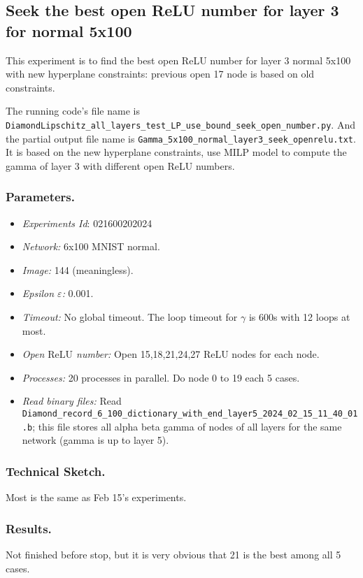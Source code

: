 \documentclass{llncs}
\newcommand{\ReLU}{\mathrm{ReLU}}
\begin{document}
\subsection{Seek the best open ReLU number for layer 3 for normal 5x100}

This experiment is to find the best open ReLU number for layer 3 normal 5x100 with new hyperplane constraints: previous open 17 node is based on old constraints.

\vspace*{1ex}

The running code's file name is \verb*|DiamondLipschitz_all_layers_test_LP_use_bound_seek_open_number.py|. And the partial output file name is \verb*|Gamma_5x100_normal_layer3_seek_openrelu.txt|.  It is based on the new hyperplane constraints, use MILP model to compute the gamma of layer 3 with different open ReLU numbers.

\subsubsection*{Parameters.}

\begin{itemize}
	\item\emph{Experiments Id}: 021600202024
	
	\item\emph{Network:} 6x100 MNIST normal. 
	
	\item\emph{Image:} 144 (meaningless).
	
	\item\emph{Epsilon $\varepsilon$:} 0.001.
	
	\item\emph{Timeout:} No global timeout. The loop timeout for $\gamma$ is 600s with 12 loops at most.
	
	\item\emph{Open $\ReLU$ number:} Open 15,18,21,24,27 ReLU nodes for each node.
	
	\item\emph{Processes:} 20 processes in parallel. Do node 0 to 19 each 5 cases.
	
	\item\emph{Read binary files:} Read \verb*|Diamond_record_6_100_dictionary_with_end_layer5_2024_02_15_11_40_01.b|; this file stores all alpha beta gamma of nodes of all layers for the same network (gamma is up to layer 5). 
\end{itemize}


\subsubsection*{Technical Sketch.}

Most is the same as Feb 15's experiments.

\subsubsection*{Results.}

Not finished before stop, but it is very obvious that 21 is the best among all 5 cases.
\end{document}
